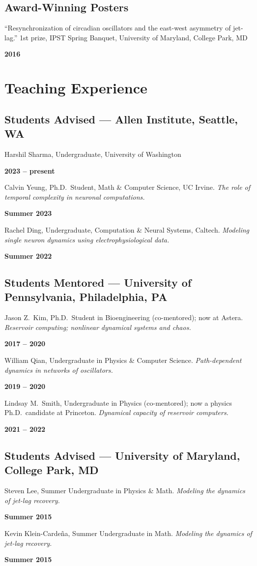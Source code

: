 \documentclass[11pt]{article}
\newcommand{\entry}[2]{%
  \par\smallskip\noindent
  \begin{minipage}[t]{0.80\textwidth}\raggedright #1\end{minipage}\hfill
  \begin{minipage}[t]{0.18\textwidth}\raggedleft\textbf{#2}\end{minipage}\par}
\let\cvOriginalSection\section
\renewcommand{\section}{\Needspace{5\baselineskip}\cvOriginalSection}
\begin{document}
\subsection*{Award-Winning Posters}
\entry{``Resynchronization of circadian oscillators and the east-west asymmetry of jet-lag.''
  1st prize, IPST Spring Banquet, University of Maryland, College Park, MD}{2016}

\section{Teaching Experience}

\subsection*{Students Advised — Allen Institute, Seattle, WA}
\entry{Harshil Sharma, Undergraduate, University of Washington}{2023 -- present}
\entry{Calvin Yeung, Ph.D.\ Student, Math \& Computer Science, UC Irvine.
  \emph{The role of temporal complexity in neuronal computations.}}{Summer 2023}
\entry{Rachel Ding, Undergraduate, Computation \& Neural Systems, Caltech.
  \emph{Modeling single neuron dynamics using electrophysiological data.}}{Summer 2022}

\subsection*{Students Mentored — University of Pennsylvania, Philadelphia, PA}
\entry{Jason Z.\ Kim, Ph.D.\ Student in Bioengineering (co-mentored); now at Astera.
  \emph{Reservoir computing; nonlinear dynamical systems and chaos.}}{2017 -- 2020}
\entry{William Qian, Undergraduate in Physics \& Computer Science.
  \emph{Path-dependent dynamics in networks of oscillators.}}{2019 -- 2020}
\entry{Lindsay M.\ Smith, Undergraduate in Physics (co-mentored); now a physics Ph.D.\ candidate at Princeton.
  \emph{Dynamical capacity of reservoir computers.}}{2021 -- 2022}

\subsection*{Students Advised — University of Maryland, College Park, MD}
\entry{Steven Lee, Summer Undergraduate in Physics \& Math.
  \emph{Modeling the dynamics of jet-lag recovery.}}{Summer 2015}
\entry{Kevin Klein-Cardeña, Summer Undergraduate in Math.
  \emph{Modeling the dynamics of jet-lag recovery.}}{Summer 2015}
\end{document}
